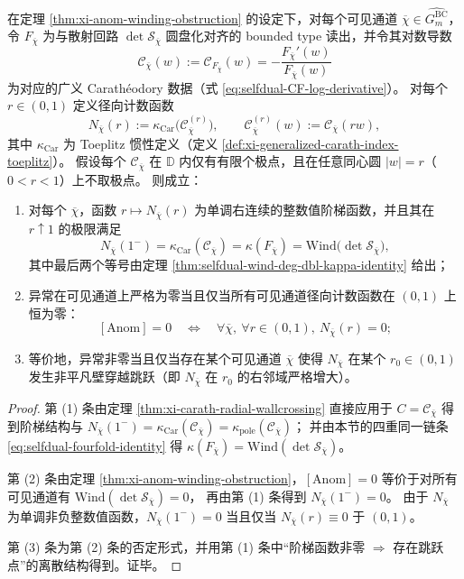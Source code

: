 \begin{theorem}\label{thm:xi-visible-anom-iff-radial-wallcrossing}
在定理 \ref{thm:xi-anom-winding-obstruction} 的设定下，对每个可见通道 \(\overline\chi\in\widehat{G^{\mathrm{BC}}_m}\)，令 \(F_{\overline\chi}\) 为与散射回路 \(\det\mathcal S_{\overline\chi}\) 圆盘化对齐的 bounded type 读出，并令其对数导数
\[
\mathscr{C}_{\overline\chi}(w):=\mathscr{C}_{F_{\overline\chi}}(w)=-\frac{F_{\overline\chi}'(w)}{F_{\overline\chi}(w)}
\]
为对应的广义 Carath\'eodory 数据（式 \eqref{eq:selfdual-CF-log-derivative}）。
对每个 \(r\in(0,1)\) 定义径向计数函数
\[
N_{\overline\chi}(r):=\kappa_{\mathrm{Car}}\!\bigl(\mathscr{C}_{\overline\chi}^{(r)}\bigr),
 \qquad
\mathscr{C}_{\overline\chi}^{(r)}(w):=\mathscr{C}_{\overline\chi}(rw),
\]
其中 \(\kappa_{\mathrm{Car}}\) 为 Toeplitz 惯性定义（定义 \ref{def:xi-generalized-carath-index-toeplitz}）。
假设每个 \(\mathscr{C}_{\overline\chi}\) 在 \(\mathbb{D}\) 内仅有有限个极点，且在任意同心圆 \(|w|=r\)（\(0<r<1\)）上不取极点。
则成立：
\begin{enumerate}
  \item 对每个 \(\overline\chi\)，函数 \(r\mapsto N_{\overline\chi}(r)\) 为单调右连续的整数值阶梯函数，并且其在 \(r\uparrow 1\) 的极限满足
  \[
  N_{\overline\chi}(1^-)=\kappa_{\mathrm{Car}}(\mathscr{C}_{\overline\chi})=\kappa(F_{\overline\chi})=\mathrm{Wind}\bigl(\det\mathcal S_{\overline\chi}\bigr),
  \]
  其中最后两个等号由定理 \ref{thm:selfdual-wind-deg-dbl-kappa-identity} 给出；
  \item 异常在可见通道上严格为零当且仅当所有可见通道径向计数函数在 \((0,1)\) 上恒为零：
  \[
  [\mathrm{Anom}]=0
  \quad\Longleftrightarrow\quad
  \forall\overline\chi,\ \forall r\in(0,1),\ N_{\overline\chi}(r)=0;
  \]
  \item 等价地，异常非零当且仅当存在某个可见通道 \(\overline\chi\) 使得 \(N_{\overline\chi}\) 在某个 \(r_0\in(0,1)\) 发生非平凡壁穿越跳跃（即 \(N_{\overline\chi}\) 在 \(r_0\) 的右邻域严格增大）。
\end{enumerate}
\end{theorem}
\begin{proof}
第 (1) 条由定理 \ref{thm:xi-carath-radial-wallcrossing} 直接应用于 \(C=\mathscr{C}_{\overline\chi}\) 得到阶梯结构与 \(N_{\overline\chi}(1^-)=\kappa_{\mathrm{Car}}(\mathscr{C}_{\overline\chi})=\kappa_{\mathrm{pole}}(\mathscr{C}_{\overline\chi})\)；
并由本节的四重同一链条 \eqref{eq:selfdual-fourfold-identity} 得 \(\kappa(F_{\overline\chi})=\mathrm{Wind}(\det\mathcal S_{\overline\chi})\)。
\par
第 (2) 条由定理 \ref{thm:xi-anom-winding-obstruction}，\([\mathrm{Anom}]=0\) 等价于对所有可见通道有 \(\mathrm{Wind}(\det\mathcal S_{\overline\chi})=0\)，
再由第 (1) 条得到 \(N_{\overline\chi}(1^-)=0\)。
由于 \(N_{\overline\chi}\) 为单调非负整数值函数，\(N_{\overline\chi}(1^-)=0\) 当且仅当 \(N_{\overline\chi}(r)\equiv 0\) 于 \((0,1)\)。
\par
第 (3) 条为第 (2) 条的否定形式，并用第 (1) 条中“阶梯函数非零 \(\Rightarrow\) 存在跳跃点”的离散结构得到。证毕。
\end{proof}

